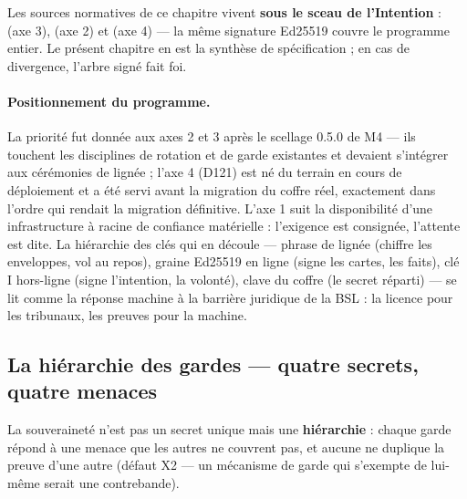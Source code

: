 Les sources normatives de ce chapitre vivent \textbf{sous le sceau de l'Intention} :
 (axe 3),  (axe 2) et
 (axe 4) — la même signature Ed25519 couvre le programme
entier. Le présent chapitre en est la synthèse de spécification ; en cas de divergence,
l'arbre signé fait foi.

\paragraph{Positionnement du programme.} La priorité fut donnée aux axes 2 et 3 après le
scellage 0.5.0 de M4 — ils touchent les disciplines de rotation et de garde existantes
et devaient s'intégrer aux cérémonies de lignée ; l'axe 4 (D121) est né du terrain en
cours de déploiement et a été servi avant la migration du coffre réel, exactement dans
l'ordre qui rendait la migration définitive. L'axe 1 suit la disponibilité d'une
infrastructure à racine de confiance matérielle : l'exigence est consignée, l'attente
est dite. La hiérarchie des clés qui en découle — phrase de lignée (chiffre les
enveloppes, vol au repos), graine Ed25519 en ligne (signe les cartes, les faits), clé I
hors-ligne (signe l'intention, la volonté), clave du coffre (le secret réparti) — se
lit comme la réponse machine à la barrière juridique de la BSL : la licence pour les
tribunaux, les preuves pour la machine.

\subsection{La hiérarchie des gardes — quatre secrets, quatre menaces}\label{sec:gardes}

La souveraineté n'est pas un secret unique mais une \textbf{hiérarchie} : chaque garde
répond à une menace que les autres ne couvrent pas, et aucune ne duplique la preuve
d'une autre (défaut X2 — un mécanisme de garde qui s'exempte de lui-même serait une
contrebande).

